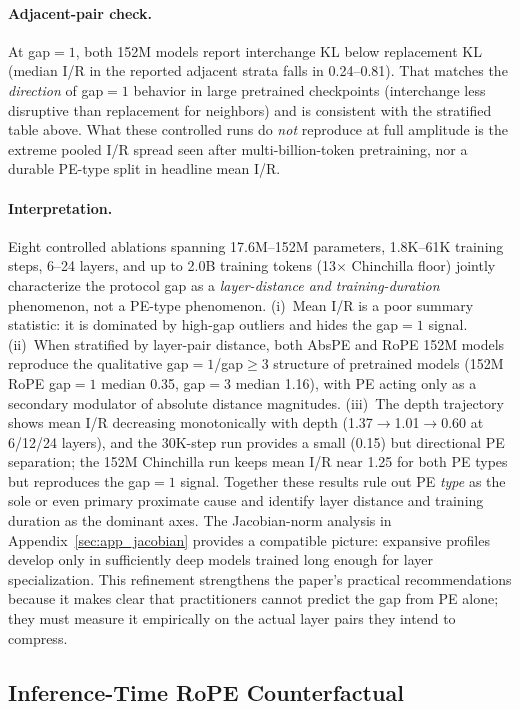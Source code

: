 \documentclass{article}
\begin{document}
\paragraph{Adjacent-pair check.}
At gap${=}1$, both 152M models report interchange KL below replacement KL (median I/R in the reported adjacent strata falls in 0.24--0.81). That matches the \emph{direction} of gap${=}1$ behavior in large pretrained checkpoints (interchange less disruptive than replacement for neighbors) and is consistent with the stratified table above. What these controlled runs do \emph{not} reproduce at full amplitude is the extreme pooled I/R spread seen after multi-billion-token pretraining, nor a durable PE-type split in headline mean I/R.

\paragraph{Interpretation.}
Eight controlled ablations spanning 17.6M--152M parameters, 1.8K--61K training steps, 6--24 layers, and up to 2.0B training tokens (13$\times$ Chinchilla floor) jointly characterize the protocol gap as a \emph{layer-distance and training-duration} phenomenon, not a PE-type phenomenon. (i)~Mean I/R is a poor summary statistic: it is dominated by high-gap outliers and hides the gap${=}1$ signal. (ii)~When stratified by layer-pair distance, both AbsPE and RoPE 152M models reproduce the qualitative gap${=}1$/gap${\geq}3$ structure of pretrained models (152M RoPE gap${=}1$ median 0.35, gap${=}3$ median 1.16), with PE acting only as a secondary modulator of absolute distance magnitudes. (iii)~The depth trajectory shows mean I/R decreasing monotonically with depth (1.37$\to$1.01$\to$0.60 at 6/12/24 layers), and the 30K-step run provides a small (0.15) but directional PE separation; the 152M Chinchilla run keeps mean I/R near 1.25 for both PE types but reproduces the gap${=}1$ signal. Together these results rule out PE \emph{type} as the sole or even primary proximate cause and identify layer distance and training duration as the dominant axes. The Jacobian-norm analysis in Appendix~\ref{sec:app_jacobian} provides a compatible picture: expansive profiles develop only in sufficiently deep models trained long enough for layer specialization. This refinement strengthens the paper's practical recommendations because it makes clear that practitioners cannot predict the gap from PE alone; they must measure it empirically on the actual layer pairs they intend to compress.

\subsection{Inference-Time RoPE Counterfactual}
\label{sec:app_rope_counterfactual}
\end{document}
